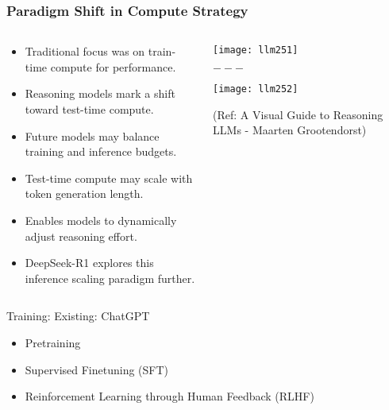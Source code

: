 \begin{frame}[fragile]\frametitle{Paradigm Shift in Compute Strategy}
\begin{columns}
    \begin{column}[T]{0.5\linewidth}
      \begin{itemize}
        \item Traditional focus was on train-time compute for performance.
        \item Reasoning models mark a shift toward test-time compute.
        \item Future models may balance training and inference budgets.
        \item Test-time compute may scale with token generation length.
        \item Enables models to dynamically adjust reasoning effort.
        \item DeepSeek-R1 explores this inference scaling paradigm further.
      \end{itemize}
    \end{column}
    \begin{column}[T]{0.5\linewidth}
        \begin{center}
        \texttt{[image: llm251]}
		
		$---$
		
        \texttt{[image: llm252]}
		
		{\tiny (Ref: A Visual Guide to Reasoning LLMs - Maarten Grootendorst)}
		
        \end{center}    
    \end{column}
  \end{columns}
\end{frame}



\begin{frame}[fragile]{Training: Existing: ChatGPT}
    \begin{itemize}
        \item Pretraining 
        \item Supervised Finetuning (SFT)
        \item Reinforcement Learning through Human Feedback (RLHF)
    \end{itemize}
\end{frame}

